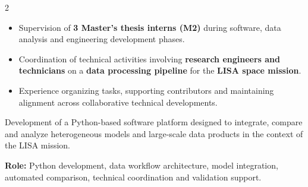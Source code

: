 \documentclass[8pt,a4paper,ragged2e,withhyper]{altacv}
\begin{document}
\begin{paracol}{2}

\begin{itemize}
  \item Supervision of \textbf{3 Master’s thesis interns (M2)} during software, data analysis and engineering development phases.
  \item Coordination of technical activities involving \textbf{research engineers and technicians} on a \textbf{data processing pipeline} for the \textbf{LISA space mission}.
  \item Experience organizing tasks, supporting contributors and maintaining alignment across collaborative technical developments.
\end{itemize}


\divider

\divider

\medskip


\divider

\divider

\divider




\end{paracol}




Development of a Python-based software platform designed to integrate, compare and analyze heterogeneous models and large-scale data products in the context of the LISA mission.

\textbf{Role:} Python development, data workflow architecture, model integration, automated comparison, technical coordination and validation support.
\end{document}
